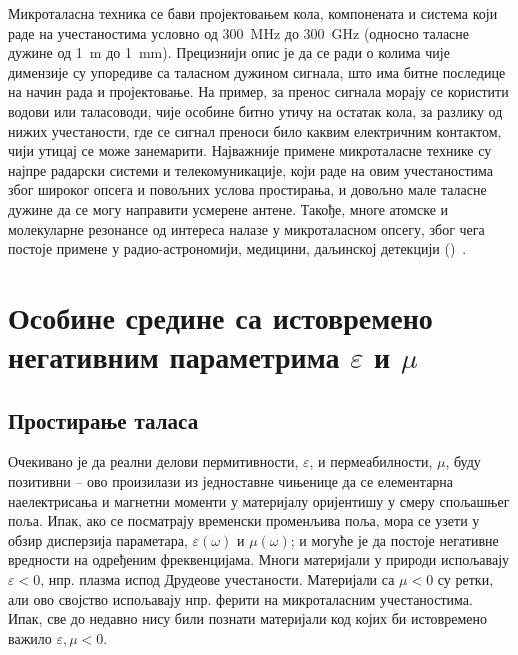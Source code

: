\documentclass[main.tex]{subfiles}
\begin{document}
Микроталасна техника се бави пројектовањем кола, компонената и система који раде на учестаностима условно од \SI{300}{\mega\hertz} до \SI{300}{\giga\hertz} (односно таласне дужине од \SI{1}{\meter} до \SI{1}{\milli\meter}). Прецизнији опис је да се ради о колима чије димензије су упоредиве са таласном дужином сигнала, што има битне последице на начин рада и пројектовање. На пример, за пренос сигнала морају се користити водови или таласоводи, чије особине битно утичу на остатак кола, за разлику од нижих учестаности, где се сигнал преноси било каквим електричним контактом, чији утицај се може занемарити. Најважније примене микроталасне технике су најпре радарски системи и телекомуникације, који раде на овим учестаностима због широког опсега и повољних услова простирања, и довољно мале таласне дужине да се могу направити усмерене антене. Такође, многе атомске и молекуларне резонансе од интереса налазе у микроталасном опсегу, због чега постоје примене у радио-астрономији, медицини, даљинској детекцији ()~\cite{djordjevic2005mikrotalasna,pozar2009microwave}.  \cite{markes_knjiga}

\section{Особине средине са истовремено негативним параметрима $\varepsilon$ и $\mu$}
\subsection{Простирање таласа}

Очекивано је да реални делови пермитивности, $\varepsilon$, и пермеабилности, $\mu$, буду позитивни – ово произилази из једноставне чињенице да се елементарна наелектрисања и магнетни моменти у материјалу оријентишу у смеру спољашњег поља. Ипак, ако се посматрају временски променљива поља, мора се узети у обзир дисперзија параметара, $\varepsilon(\omega)$ и $\mu(\omega)$; и могуће је да постоје негативне вредности на одређеним фреквенцијама. Многи материјали у природи испољавају $\varepsilon < 0$, нпр. плазма испод Друдеове учестаности. Материјали са $\mu<0$ су ретки, али ово својство испољавају нпр. ферити на микроталасним учестаностима. Ипак, све до недавно нису били познати материјали код којих би истовремено важило $\varepsilon,\mu < 0$.
\end{document}
